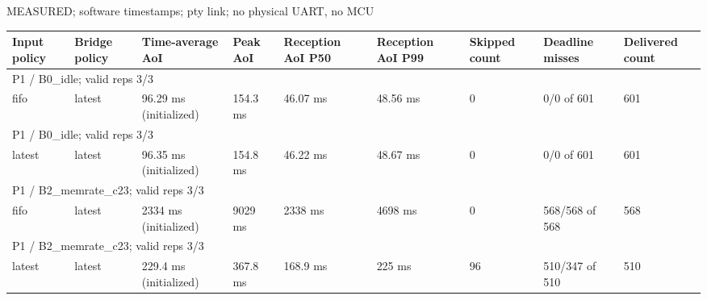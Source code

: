 \par\noindent MEASURED; software timestamps; pty link; no physical UART, no MCU\par
\begin{tabular}{lllllllll}
\toprule
Input policy & Bridge policy & Time-average AoI & Peak AoI & Reception AoI P50 & Reception AoI P99 & Skipped count & Deadline misses & Delivered count \\
\midrule
\multicolumn{9}{l}{P1 / B0\_idle; valid reps 3/3} \\
fifo & latest & 96.29 ms (initialized) & 154.3 ms & 46.07 ms & 48.56 ms & 0 & 0/0 of 601 & 601 \\
\multicolumn{9}{l}{P1 / B0\_idle; valid reps 3/3} \\
latest & latest & 96.35 ms (initialized) & 154.8 ms & 46.22 ms & 48.67 ms & 0 & 0/0 of 601 & 601 \\
\multicolumn{9}{l}{P1 / B2\_memrate\_c23; valid reps 3/3} \\
fifo & latest & 2334 ms (initialized) & 9029 ms & 2338 ms & 4698 ms & 0 & 568/568 of 568 & 568 \\
\multicolumn{9}{l}{P1 / B2\_memrate\_c23; valid reps 3/3} \\
latest & latest & 229.4 ms (initialized) & 367.8 ms & 168.9 ms & 225 ms & 96 & 510/347 of 510 & 510 \\
\bottomrule
\end{tabular}
